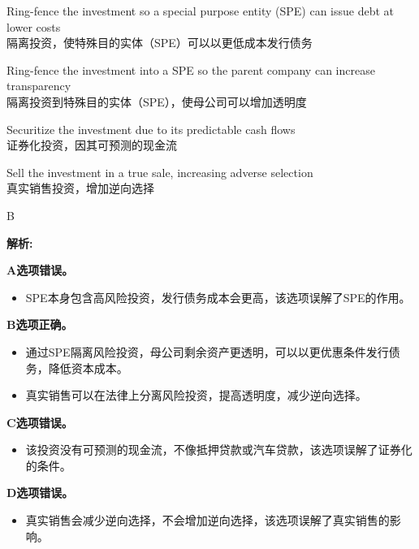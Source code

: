 \documentclass{article}
\newenvironment{explanation}
{\textbf{解析:}\par}
{\par}
\begin{document}
\begin{choices}
    \item Ring-fence the investment so a special purpose entity (SPE) can issue debt at lower costs\\
    隔离投资，使特殊目的实体（SPE）可以以更低成本发行债务
    \item Ring-fence the investment into a SPE so the parent company can increase transparency\\
    隔离投资到特殊目的实体（SPE），使母公司可以增加透明度
    \item Securitize the investment due to its predictable cash flows\\
    证券化投资，因其可预测的现金流
    \item Sell the investment in a true sale, increasing adverse selection\\
    真实销售投资，增加逆向选择
\end{choices}

\begin{correctanswer}
    B
\end{correctanswer}

\begin{explanation}
    \textbf{A选项错误。}
    \begin{itemize}
        \item SPE本身包含高风险投资，发行债务成本会更高，该选项误解了SPE的作用。
    \end{itemize}

    \textbf{B选项正确。}
    \begin{itemize}
        \item 通过SPE隔离风险投资，母公司剩余资产更透明，可以以更优惠条件发行债务，降低资本成本。
        \item 真实销售可以在法律上分离风险投资，提高透明度，减少逆向选择。
    \end{itemize}

    \textbf{C选项错误。}
    \begin{itemize}
        \item 该投资没有可预测的现金流，不像抵押贷款或汽车贷款，该选项误解了证券化的条件。
    \end{itemize}

    \textbf{D选项错误。}
    \begin{itemize}
        \item 真实销售会减少逆向选择，不会增加逆向选择，该选项误解了真实销售的影响。
    \end{itemize}
\end{explanation}
\end{document}
